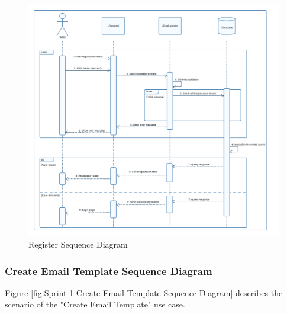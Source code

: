 \begin{figure}[ht]
	\centering
	\includegraphics[width=\linewidth]{Images/Sprint1/sequence diagram sprint 1/register v3.png}
	\caption{ Register Sequence Diagram}
	\label{fig:Sprint 1 Register Sequence Diagram}
\end{figure}

\clearpage

\subsubsection{Create Email Template Sequence Diagram}

Figure \ref{fig:Sprint 1 Create Email Template Sequence Diagram} describes the scenario of the "Create Email Template" use case.

